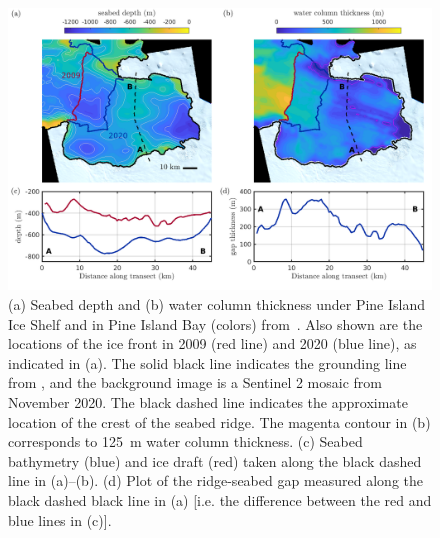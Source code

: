 \documentclass[draft]{agujournal2019}
\begin{document}
\begin{figure}
    \centering
    \includegraphics[width = \textwidth]{../make_figures/plots/figure1.png}
    \caption{(a) Seabed depth and (b) water column thickness under Pine Island Ice Shelf and in Pine Island Bay (colors) from~. Also shown are the locations of the ice front in 2009 (red line) and 2020 (blue line), as indicated in (a).  The solid black line indicates the grounding line from , and the background image is a Sentinel 2 mosaic from November 2020. The black dashed line indicates the approximate location of the crest of the seabed ridge. The magenta contour in (b) corresponds to 125~m  water column thickness. (c) Seabed bathymetry (blue) and ice draft (red) taken along the black dashed line in (a)--(b). (d) Plot of the ridge-seabed gap measured along the black dashed black line in (a) [i.e. the difference between the red and blue lines in (c)]. }
    \label{fig:figure1}
\end{figure}
\end{document}
